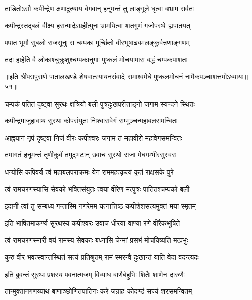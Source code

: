 \twolineshloka
{ताडितोऽसौ कपीन्द्रेण क्षणादुत्थाय वेगवान्}
{हनूमन्तं तु लाङ्गूले धृत्वा बभ्राम सर्वतः}%

\twolineshloka
{कपीन्द्रस्तद्बलं वीक्ष्य हसन्पादेऽग्रहीत्पुनः}
{भ्रामयित्वा शतगुणं गजोपस्थे ह्यपातयत्}%

\twolineshloka
{पपात भूमौ सुबलो राजसूनुः स चम्पकः}
{मूर्च्छितो वीरभूषाढ्यमलङ्कुर्वन्रणाङ्गणम्}%

\twolineshloka
{तदा हाहेति वै लोकाश्चुक्रुशुश्चम्पकानुगाः}
{पुष्कलं मोचयामास बद्धं चम्पकपाशतः}%

{॥इति श्रीपद्मपुराणे पातालखण्डे शेषवात्स्यायनसंवादे रामाश्वमेधे पुष्कलमोचनं नामैकपञ्चाशत्तमोऽध्यायः॥५१॥}

\resetShloka


\twolineshloka
{चम्पकं पतितं दृष्ट्वा सुरथः क्षत्रियो बली}
{पुत्रदुःखपरीताङ्गो जगाम स्यन्दने स्थितः}%

\twolineshloka
{कपीन्द्रमाजुहावाथ सुरथः कोपसंयुतः}
{निःश्वासवेगं सम्मुञ्चन्महाबलसमन्वितः}%

\twolineshloka
{आह्वयानं नृपं दृष्ट्वा निजं वीरः कपीश्वरः}
{जगाम तं महावीरो महावेगसमन्वितः}%

\twolineshloka
{तमागतं हनूमन्तं तृणीकुर्वं तमुद्भटान्}
{उवाच सुरथो राजा मेघगम्भीरसुस्वरः}%


\twolineshloka
{धन्योसि कपिवर्य त्वं महाबलपराक्रमः}
{येन राममहत्कृत्यं कृतं राक्षसके पुरे}%

\twolineshloka
{त्वं रामचरणस्यासि सेवको भक्तिसंयुतः}
{त्वया वीरेण मत्पुत्रः पातितश्चम्पको बली}%

\twolineshloka
{इदानीं त्वां तु सम्बध्य गन्तास्मि नगरेमम}
{यत्नात्तिष्ठ कपीशेशसत्यमुक्तं मया स्मृतम्}%

\twolineshloka
{इति भाषितमाकर्ण्य सुरथस्य कपीश्वरः}
{उवाच धीरया वाण्या रणे वीरैकभूषिते}%


\twolineshloka
{त्वं रामचरणस्मारी वयं रामस्य सेवकाः}
{बध्नासि चेन्मां प्रसभं मोचयिष्यति मत्प्रभुः}%

\twolineshloka
{कुरु वीर भवत्स्वान्तस्थितं सत्यं प्रतिश्रुतम्}
{रामं स्मरन्वै दुःखान्तं याति वेदा वदन्त्यदः}%


\twolineshloka
{इति ब्रुवन्तं सुरथः प्रशस्य पवनात्मजम्}
{विव्याध बाणैर्बहुभिः शितैः शाणेन दारुणैः}%

\twolineshloka
{तान्मुक्तानगणय्याथ बाणाञ्छोणितपातिनः}
{करे जग्राह कोदण्डं सज्यं शरसमन्वितम्}%

